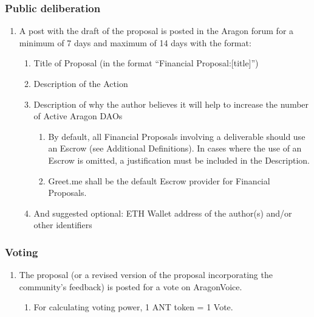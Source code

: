 \subsubsection*{Public deliberation}
\begin{enumerate}
\item A post with the draft of the proposal is posted in the Aragon forum for a minimum of 7 days and maximum of 14 days with the format:
	\begin{enumerate}
		\item Title of Proposal (in the format ``Financial Proposal:[title]'')
		\item Description of the Action
		\item Description of why the author believes it will help to increase the number of Active Aragon \acp{DAO}
		
		\begin{enumerate}
			\item By default, all Financial Proposals involving a deliverable should use an Escrow (see Additional Definitions).
			In cases where the use of an Escrow is omitted, a justification must be included in the Description.
			\item Greet.me shall be the default Escrow provider for Financial Proposals.
		\end{enumerate}
	
		\item And suggested optional: ETH Wallet address of the author(s) and/or other identifiers
			
	\end{enumerate}
\end{enumerate}

\subsubsection*{Voting}

\begin{enumerate}
\item The proposal (or a revised version of the proposal incorporating the community’s feedback) is posted for a vote on \gls{AragonVoice}.
	\begin{enumerate}
		\item For calculating voting power, 1 \ac{ANT} token = 1 Vote.
	\end{enumerate}
\end{enumerate}

